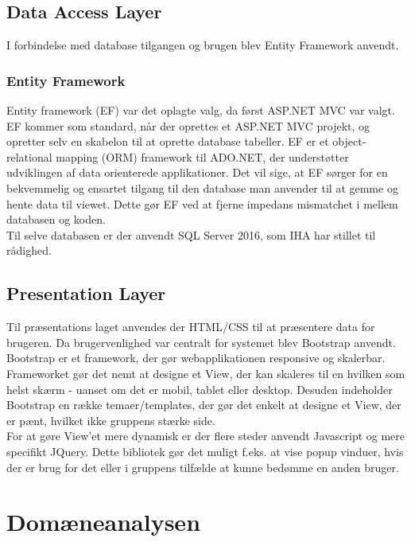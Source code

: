\subsection{Data Access Layer}
I forbindelse med database tilgangen og brugen blev Entity Framework anvendt.
 
 \subsubsection{Entity Framework}
Entity framework (EF)\cite{ADOEF} var det oplagte valg, da først ASP.NET MVC var valgt. EF kommer som standard, når der oprettes et ASP.NET MVC projekt, og opretter selv en skabelon til at oprette database tabeller. EF er et object-relational mapping (ORM) framework til ADO.NET, der understøtter udviklingen af data orienterede applikationer. Det vil sige, at EF sørger for en bekvemmelig og ensartet tilgang til den database man anvender til at gemme og hente data til viewet. Dette gør EF ved at fjerne impedans mismatchet i mellem databasen og koden.\\
 \noindent Til selve databasen er der anvendt SQL Server 2016, som IHA har stillet til rådighed.
 
\subsection{Presentation Layer}
Til præsentations laget anvendes der HTML/CSS til at præsentere data for brugeren. Da brugervenlighed var centralt for systemet blev Bootstrap\cite{Bootstrap} anvendt. Bootstrap er et framework, der gør webapplikationen responsive og skalerbar. Frameworket gør det nemt at designe et View, der kan skaleres til en hvilken som helst skærm - uanset om det er mobil, tablet eller desktop. Desuden indeholder Bootstrap en række temaer/templates, der gør det enkelt at designe et View, der er pænt, hvilket ikke gruppens stærke side. \\
For at gøre View'et mere dynamisk er der flere steder anvendt Javascript og mere specifikt JQuery\cite{jQuery}. 
Dette bibliotek gør det muligt f.eks. at vise popup vinduer, hvis der er brug for det eller i gruppens tilfælde at kunne bedømme en anden bruger.

\section{Domæneanalysen}

